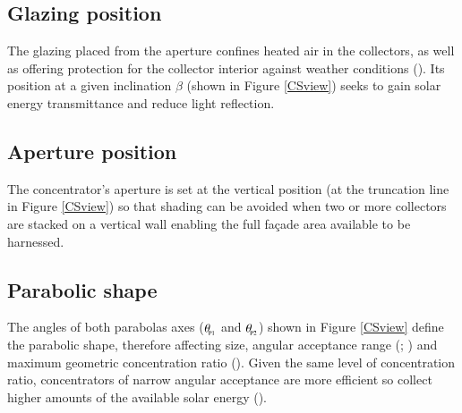 

\subsection{Glazing position}
The glazing placed from the aperture confines heated air in the collectors, as well as offering protection for the collector interior against weather conditions (\cite{Shams2016}). Its position at a given inclination $\beta$ (shown in Figure \ref{CSview}) seeks to gain solar energy transmittance and reduce light reflection.

\subsection{Aperture position}
The concentrator's aperture is set at the vertical position (at the truncation line in Figure \ref{CSview}) so that shading can be avoided when two or more collectors are stacked on a vertical wall enabling the full fa\c{c}ade area available to be harnessed.

\subsection{Parabolic shape}
The angles of both parabolas axes ($\theta_{\!_{\rm{P1}}}$ and $\theta_{\!_{\rm{P2}}}$) shown in Figure \ref{CSview} define the parabolic shape, therefore affecting size, angular acceptance range (\cite{Zacharopoulos2000}; \cite{Harmim2012}) and maximum geometric concentration ratio (\cite{Mills1978}). Given the same level of concentration ratio, concentrators of narrow angular acceptance are more efficient so collect higher amounts of the available solar energy (\cite{Sarmah2011}).
    
    
